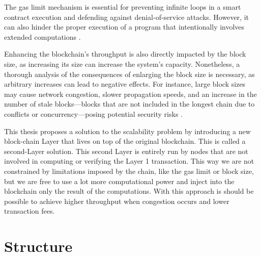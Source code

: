 The gas limit mechanism is essential for preventing infinite loops in a smart contract execution and defending against denial-of-service attacks. However, it can also hinder the proper execution of a program that intentionally involves extended computations \cite{wood_ethereum_nodate}.

Enhancing the blockchain's throughput is also directly impacted by the block size, as increasing its size can increase the system's capacity. Nonetheless, a thorough analysis of the consequences of enlarging the block size is necessary, as arbitrary increases can lead to negative effects. For instance, large block sizes may cause network congestion, slower propagation speeds, and an increase in the number of stale blocks—blocks that are not included in the longest chain due to conflicts or concurrency—posing potential security risks \cite{gervais_security_2016}.

This thesis proposes a solution to the scalability problem by introducing a new block-chain Layer that lives on top of the original blockchain. This is called a second-Layer solution. This second Layer is entirely run by nodes that are not involved in computing or verifying the Layer 1 transaction. This way we are not constrained by limitations imposed by the chain, like the gas limit or block size, but we are free to use a lot more computational power and inject into the blockchain only the result of the computations. With this approach is should be possible to achieve higher throughput when congestion occurs and lower transaction fees. 


\section{Structure\label{sec:structure}}


